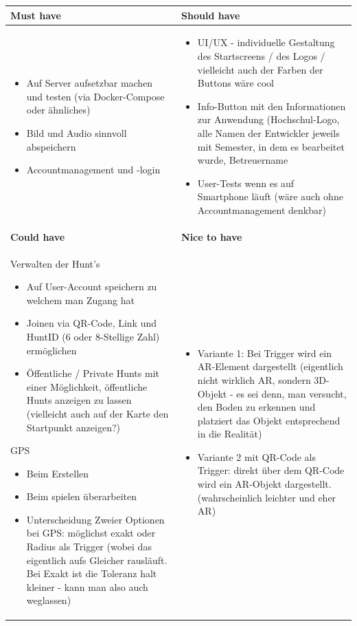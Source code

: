 \documentclass[oneside]{ausarbeitung}
\begin{document}
\begin{table}[htbp]
\centering
\begin{tabular}{|p{7cm}|p{7cm}|}
\hline
\textbf{Must have} & \textbf{Should have} \\ \hline
\begin{itemize}
    \item Auf Server aufsetzbar machen und testen (via Docker-Compose oder ähnliches)
    \item Bild und Audio sinnvoll abspeichern 
    \item Accountmanagement und -login
\end{itemize}
& 

\begin{itemize}
    \item UI/UX - individuelle Gestaltung des Startscreens / des Logos / vielleicht auch der Farben der Buttons wäre cool
    \item Info-Button mit den Informationen zur Anwendung (Hochschul-Logo, alle Namen der Entwickler jeweils mit Semester, in dem es bearbeitet wurde, Betreuername
    \item User-Tests wenn es auf Smartphone läuft (wäre auch ohne Accountmanagement denkbar)
\end{itemize}
\\ \hline

\textbf{Could have} & \textbf{Nice to have} \\ \hline

Verwalten der Hunt's 
\begin{itemize}

    \item Auf User-Account speichern zu welchem man Zugang hat
    \item Joinen via QR-Code, Link und HuntID (6 oder 8-Stellige Zahl) ermöglichen
    \item Öffentliche / Private Hunts mit einer Möglichkeit, öffentliche Hunts anzeigen zu lassen (vielleicht auch auf der Karte den Startpunkt anzeigen?)
\end{itemize}

GPS
 \begin{itemize}
     \item Beim Erstellen
     \item Beim spielen überarbeiten
     \item Unterscheidung Zweier Optionen bei GPS: möglichst exakt oder Radius als Trigger (wobei das eigentlich aufs Gleicher rausläuft. Bei Exakt ist die Toleranz halt kleiner - kann man also auch weglassen)
 \end{itemize}
& 
\begin{itemize}
    \item Variante 1: Bei Trigger wird ein AR-Element dargestellt (eigentlich nicht wirklich AR, sondern 3D-Objekt - es sei denn, man versucht, den Boden zu erkennen und platziert das Objekt entsprechend in die Realität)
    \item Variante 2 mit QR-Code als Trigger: direkt über dem QR-Code wird ein AR-Objekt dargestellt. (wahrscheinlich leichter und eher AR)
\end{itemize}


\end{tabular}
\end{table}
\end{document}
